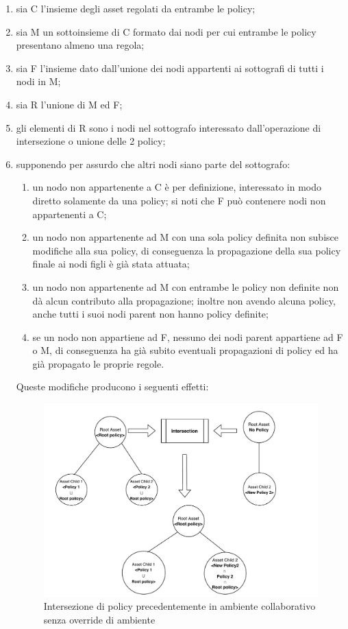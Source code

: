 \documentclass[12pt,a4paper,twoside]{book}
\begin{document}
\begin{enumerate}
\item sia C l'insieme degli asset regolati da entrambe le policy;
\item sia M un sottoinsieme di C formato dai nodi per cui entrambe le policy presentano almeno una regola;
\item sia F l'insieme dato dall'unione dei nodi appartenti ai sottografi di tutti i nodi in M;
\item sia R l'unione di M ed F;
\item gli elementi di R sono i nodi nel sottografo interessato dall'operazione di intersezione o unione delle 2 policy;
\item supponendo per assurdo che altri nodi siano parte del sottografo:
\begin{enumerate}
\item un nodo non appartenente a C è per definizione, interessato in modo diretto solamente da una policy; si noti che F può contenere nodi non appartenenti a C;
\item un nodo non appartenente ad M con una sola policy definita non subisce modifiche alla sua policy, di conseguenza la propagazione della sua policy finale ai nodi figli è già stata attuata;
\item un nodo non appartenente ad M con entrambe le policy non definite non dà alcun contributo alla propagazione; inoltre non avendo alcuna policy, anche tutti i suoi nodi parent non hanno policy definite;
\item se un nodo non appartiene ad F, nessuno dei nodi parent appartiene ad F o M, di conseguenza ha già subito eventuali propagazioni di policy ed ha già propagato le proprie regole.
\end{enumerate}
Queste modifiche producono i seguenti effetti:
\begin{figure}[H]
\centering
\includegraphics[scale=0.6]{../immagini/correctProp.pdf}
\caption{Intersezione di policy precedentemente in ambiente collaborativo senza override di ambiente}
\label{correctProp}
\end{figure}
\end{enumerate}
\end{document}
